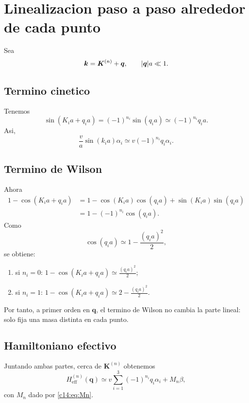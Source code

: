 \section{Linealizacion paso a paso alrededor de cada punto}
Sea
\begin{equation}
\bm{k}=\bm{K}^{(n)}+\bm{q},
\qquad
\abs{\bm{q}}a\ll 1.
\end{equation}

\subsection{Termino cinetico}
Tenemos
\begin{equation}
\sin(K_i a + q_i a)=(-1)^{n_i}\sin(q_i a)\simeq (-1)^{n_i}q_i a.
\end{equation}
Asi,
\begin{equation}
\frac{v}{a}\sin(k_i a)\alpha_i
\simeq
v(-1)^{n_i}q_i\alpha_i.
\end{equation}

\subsection{Termino de Wilson}
Ahora
\begin{align}
1-\cos(K_i a+q_i a)
&=
1-\cos(K_i a)\cos(q_i a)+\sin(K_i a)\sin(q_i a)
\\
&=
1-(-1)^{n_i}\cos(q_i a).
\end{align}
Como
\begin{equation}
\cos(q_i a)\simeq 1-\frac{(q_i a)^2}{2},
\end{equation}
se obtiene:
\begin{enumerate}[label=\arabic*.]
    \item si \(n_i=0\): \(1-\cos(K_i a+q_i a)\simeq \frac{(q_i a)^2}{2}\);
    \item si \(n_i=1\): \(1-\cos(K_i a+q_i a)\simeq 2-\frac{(q_i a)^2}{2}\).
\end{enumerate}

Por tanto, a primer orden en \(\bm{q}\), el termino de Wilson no cambia la parte lineal: solo fija una masa distinta en cada punto.

\subsection{Hamiltoniano efectivo}
Juntando ambas partes, cerca de \(\bm{K}^{(n)}\) obtenemos
\begin{equation}
H^{(n)}_{\text{eff}}(\bm{q})
\simeq
v\sum_{i=1}^3 (-1)^{n_i}q_i\alpha_i
+
M_n\beta,
\label{c14:eq:Heffn}
\end{equation}
con \(M_n\) dado por \eqref{c14:eq:Mn}.


